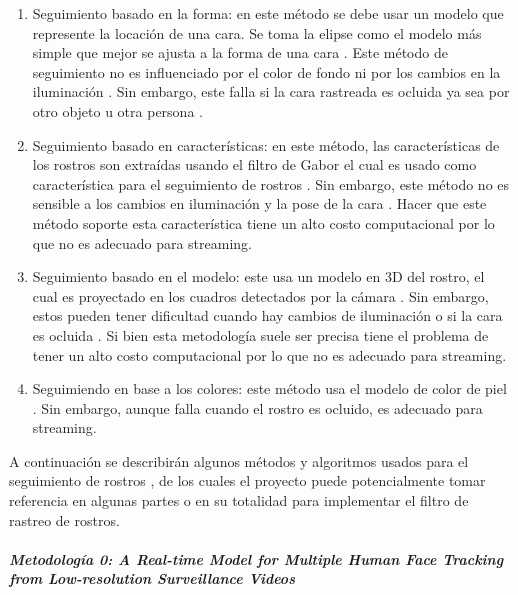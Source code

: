\documentclass[a4paper,openright,12pt]{report}
\begin{document}
\begin{enumerate}
    \item Seguimiento basado en la forma: en este método se debe usar un modelo
    que represente la locación de una cara. Se toma la elipse como el modelo más
    simple que mejor se ajusta a la forma de una cara \cite{eleftheriadis1995automatic}. Este método de
    seguimiento no es influenciado por el color de fondo ni por los cambios en
    la iluminación \cite{shaik2007robust}. Sin embargo, este falla si la cara rastreada es ocluida ya
    sea por otro objeto u otra persona \cite{shaik2007robust}.
    \item Seguimiento basado en características:  en este método, las
    características de los rostros son extraídas usando el filtro de Gabor el
    cual es usado como característica para el seguimiento de rostros \cite{shaik2007robust}. Sin
    embargo, este método no es sensible a los cambios en iluminación y la pose
    de la cara \cite{shaik2007robust}. Hacer que este método soporte esta característica tiene un alto
    costo computacional por lo que no es adecuado para streaming.
    \item Seguimiento basado en el modelo: este usa un modelo en 3D del rostro,
    el cual es proyectado en los cuadros detectados por la cámara \cite{shaik2007robust}. Sin embargo,
    estos pueden tener dificultad cuando hay cambios de iluminación o si la cara
    es ocluida \cite{smolyanskiy2014real}. Si bien esta metodología suele ser precisa tiene el problema de
    tener un alto costo computacional por lo que no es adecuado para streaming.
    \item Seguimiendo en base a los colores: este método usa el modelo de color
    de piel \cite{shaik2007robust}. Sin embargo, aunque falla cuando el rostro es ocluido, es adecuado
    para streaming.
\end{enumerate}

A continuación se describirán algunos métodos y algoritmos usados para el
seguimiento de rostros , de los cuales el proyecto puede potencialmente tomar
referencia en algunas partes o en su totalidad para implementar el filtro de
rastreo de rostros.

\subparagraph{Metodología 0: A Real-time Model for Multiple Human Face Tracking
              from Low-resolution Surveillance Videos}\mbox{} \\
\end{document}
